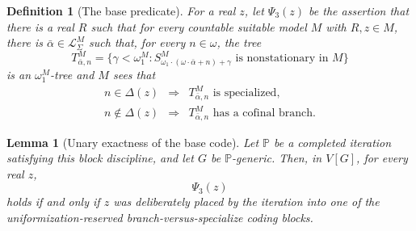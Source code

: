\documentclass[10pt,a4paper]{amsart}
\newtheorem{lemma}{Lemma}
\newtheorem{definition}{Definition}
\newcommand{\Pp}{\mathbb P}
\newcommand{\PsiThree}{\Psi_{3}}
\begin{document}
\begin{definition}[The base predicate]\label{def:psi3}
For a real $z$, let $\PsiThree(z)$ be the assertion that there is a real $R$ such
that for every countable suitable model $M$ with $R,z\in M$, there is
$\bar\alpha\in\mathcal L_\Sigma^M$ such that, for every $n\in\omega$, the tree
\[
T^M_{\bar\alpha,n}=\{\gamma<\omega_1^M:
S^M_{\omega_1\cdot(\omega\cdot\bar\alpha+n)+\gamma}
\text{ is nonstationary in }M\}
\]
is an $\omega_1^M$-tree and $M$ sees that
\[
\begin{array}{rcl}
n\in\Delta(z)&\Longrightarrow& T^M_{\bar\alpha,n}\text{ is specialized},\\
n\notin\Delta(z)&\Longrightarrow& T^M_{\bar\alpha,n}\text{ has a cofinal branch}.
\end{array}
\]
\end{definition}

\begin{lemma}[Unary exactness of the base code]\label{lem:block-correctness}
Let $\Pp$ be a completed iteration satisfying this block discipline, and let $G$ be
$\Pp$-generic.  Then, in $V[G]$, for every real $z$,
\[
\PsiThree(z)
\]
holds if and only if $z$ was deliberately placed by the iteration into one of the
uniformization-reserved branch-versus-specialize coding blocks.
\end{lemma}
\end{document}
